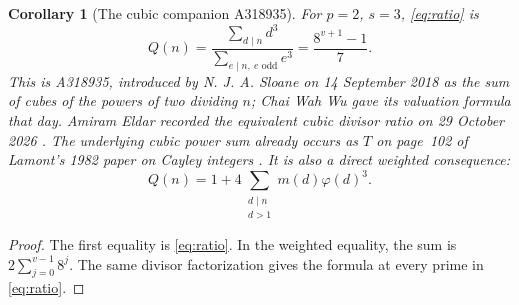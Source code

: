 \documentclass[11pt]{article}
\newtheorem{corollary}{Corollary}
\begin{document}
\begin{corollary}[The cubic companion A318935]\label{cor:cubic}
For $p=2$, $s=3$, \eqref{eq:ratio} is
\[
 Q(n)=\frac{\sum_{d\mid n}d^3}{\sum_{e\mid n,\ e\text{ odd}}e^3}
     =\frac{8^{v+1}-1}{7}.
\]
This is A318935, introduced by N. J. A. Sloane on 14 September 2018
as the sum of cubes of the powers of two dividing $n$; Chai Wah Wu gave
its valuation formula that day. Amiram Eldar recorded the equivalent
cubic divisor ratio on 29 October 2026 \cite{cubic}.
The underlying cubic power sum already occurs as $T$ on page~102 of
Lamont's 1982 paper on Cayley integers \cite{lamont}.
It is also a direct weighted consequence:
\[
 Q(n)=1+4\sum_{\substack{d\mid n\\d>1}}m(d)\varphi(d)^3.
\]
\end{corollary}
\begin{proof}
The first equality is \eqref{eq:ratio}. In the weighted equality, the
sum is $2\sum_{j=0}^{v-1}8^j$. The same divisor
factorization gives the formula at every prime in \eqref{eq:ratio}.
\end{proof}
\end{document}
